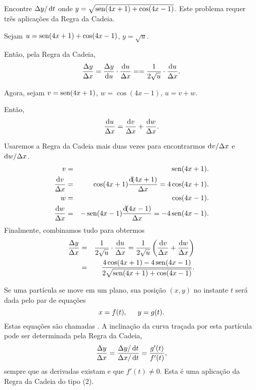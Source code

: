 \begin{example}
Encontre $\dy/\dt$ onde $y = \sqrt{\operatorname{sen}(4x+1)+\cos(4x-1)}$. Este problema
requer três aplicações da Regra da Cadeia.

Sejam \hspace{1.5em} $u = \operatorname{sen}(4x+1)+\cos(4x-1)$, \hspace{1.5em} $y=\sqrt{u}$.

Então, pela Regra da Cadeia,
$$
  \frac{\dy}{\dx} = \frac{\dy}{\du} \cdot \frac{\du}{\dx} =
    = \frac{1}{2\sqrt{u}} \cdot \frac{\du}{\dx}.
$$

Agora, sejam \hspace{1.5em} $v = \operatorname{sen}(4x+1)$, \hspace{1.5em} $w = \cos(4x-1)$,
\hspace{1.5em} $u = v + w$.

Então,
$$
  \frac{\du}{\dx} = \frac{\dv}{\dx} + \frac{\dif w}{\dx}.
$$

Usaremos a Regra da Cadeia mais duas vezes para encontrarmos $\dv/\dx$ e
$\dif w/\dx$.
\begin{eqnarray*}
  v & = & \sen(4x+1). \\
  \frac{\dv}{\dx} & = & \cos(4x+1)\frac{\dif(4x+1)}{\dx} = 4\cos(4x+1). \\
  w & = & \cos(4x-1). \\
  \frac{\dif w}{\dx} & = & -\sen(4x-1)\frac{\dif(4x-1)}{\dx} = -4\sen(4x-1).
\end{eqnarray*}
Finalmente, combinamos tudo para obtermos
\begin{eqnarray*}
  \frac{\dy}{\dx} & = & \frac{1}{2\sqrt{u}} \cdot \frac{\du}{\dx} =
    \frac{1}{2\sqrt{u}}\left(\frac{\dv}{\dx} + \frac{\dif w}{\dx}\right) \\
  & = & \frac{4\cos(4x+1) - 4\sen(4x-1)}{2\sqrt{\sen(4x+1)+\cos(4x-1)}}.
\end{eqnarray*}
\end{example}

Se uma partícula se move em um plano, sua posição $(x, y)$ no instante $t$
será dada pelo par de equações
$$
  x = f(t), \hspace{1.5em} y = g(t).
$$
Estas equações são chamadas
. A inclinação da curva
traçada por esta partícula pode ser determinada pela Regra da Cadeia,
$$
  \frac{\dy}{\dx} = \frac{\dy/\dt}{\dx/\dt} = \frac{g'(t)}{f'(t)},
$$
sempre que as derivadas existam e que $f'(t) \ne 0$. Esta é uma aplicação
da Regra da Cadeia do tipo (2).


